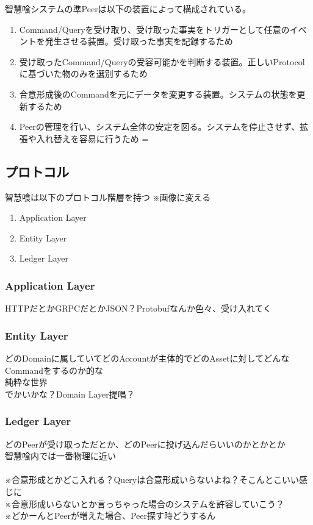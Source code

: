 \documentclass[10pt,a4paper]{jarticle}
\begin{document}
\begin{multicols}{2}
智慧喰システムの準Peerは以下の装置によって構成されている。
\begin{enumerate}
  \item Command/Queryを受け取り、受け取った事実をトリガーとして任意のイベントを発生させる装置。受け取った事実を記録するため
  \item 受け取ったCommand/Queryの受容可能かを判断する装置。正しいProtocolに基づいた物のみを選別するため
  \item 合意形成後のCommandを元にデータを変更する装置。システムの状態を更新するため
  \item Peerの管理を行い、システム全体の安定を図る。システムを停止させず、拡張や入れ替えを容易に行うため  =
\end{enumerate}

\subsection{プロトコル}
智慧喰は以下のプロトコル階層を持つ
※画像に変える
\begin{enumerate}
  \item Application Layer
  \item Entity Layer
  \item Ledger Layer
\end{enumerate}

\subsubsection{Application Layer}
HTTPだとかGRPCだとかJSON？Protobufなんか色々、受け入れてく

\subsubsection{Entity Layer}
どのDomainに属していてどのAccountが主体的でどのAssetに対してどんなCommandをするのか的な\\
純粋な世界\\
でかいかな？Domain Layer提唱？\\

\subsubsection{Ledger Layer}
どのPeerが受け取っただとか、どのPeerに投げ込んだらいいのかとかとか\\
智慧喰内では一番物理に近い\\
\\
※合意形成とかどこ入れる？Queryは合意形成いらないよね？そこんとこいい感じに\\
※合意形成いらないとか言っちゃった場合のシステムを許容していこう？\\
※どかーんとPeerが増えた場合、Peer探す時どうするん\\


\end{multicols}
\end{document}
